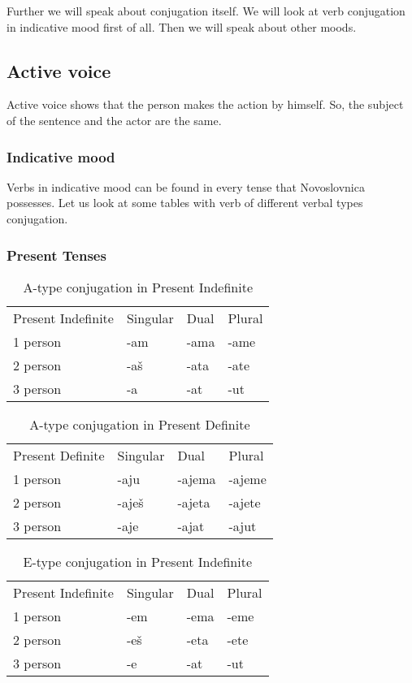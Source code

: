 Further we will speak about conjugation itself. We will look at verb conjugation in indicative mood first of all. Then we will speak about other moods.

\subsection{Active voice}

Active voice shows that the person makes the action by himself. So, the subject of the sentence and the actor are the same.

\subsubsection{Indicative mood}

Verbs in indicative mood can be found in every tense that Novoslovnica possesses. Let us look at some tables with verb of different verbal types conjugation.

\subsubsection{Present Tenses}

\begin{table}[!htb]
	\caption{A-type conjugation in Present Indefinite}
	\begin{tabular}{llll}
		Present Indefinite & Singular & Dual & Plural \\
		1 person & -am & -ama & -ame \\
		2 person & -aš & -ata & -ate \\
		3 person & -a & -at & -ut
	\end{tabular}
\end{table}


\begin{table}[!htb]
	\caption{A-type conjugation in Present Definite}
	\begin{tabular}{llll}
		Present Definite & Singular & Dual & Plural \\
		1 person & -aju & -ajema & -ajeme \\
		2 person & -aješ & -ajeta & -ajete \\
		3 person & -aje & -ajat & -ajut
	\end{tabular}
\end{table}

\begin{table}[!htb]
	\caption{E-type conjugation in Present Indefinite}
	\begin{tabular}{llll}
		Present Indefinite & Singular & Dual & Plural \\
		1 person & -em & -ema & -eme \\
		2 person & -eš & -eta & -ete \\
		3 person & -e & -at & -ut
	\end{tabular}
\end{table}


